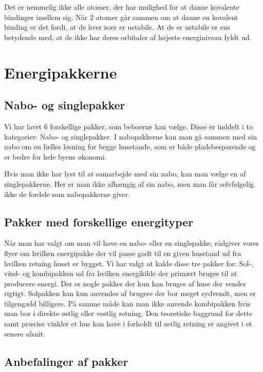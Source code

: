 \documentclass[12pt,a4paper]{article}
\theoremstyle{break}
\theoremstyle{nonumberplain}
\begin{document}
	



\pagebreak



Det er nemmelig ikke alle atomer, der har mulighed for at danne kovalente bindinger imellem sig. Når 2 atomer går sammen om at danne en kovalent binding er det fordi, at de hver især er ustabile. At de er ustabile er ens betydende med, at de ikke har deres orbitaler af højeste energiniveau fyldt ud. 

\section{Energipakkerne}
\subsection{Nabo- og singlepakker}
Vi har lavet 6 forskellige pakker, som beboerne kan vælge. Disse er inddelt i to kategorier: Nabo- og singlepakker.
I nabopakkerne kan man gå sammen med sin nabo om en fælles løsning for begge husstande, som er både pladsbesparende og er bedre for hele byens økonomi. 

Hvis man ikke har lyst til at samarbejde med sin nabo, kan man vælge en af singlepakkerne. 
Her er man ikke afhængig af sin nabo, men man får selvfølgelig ikke de fordele som nabopakkerne giver. 

\subsection{Pakker med forskellige energityper}
Når man har valgt om man vil have en nabo- eller en singlepakke, rådgiver vores flyer om hvilken energipakke der vil passe godt til en given husstand ud fra hvilken retning huset er bygget. 
Vi har valgt at kalde disse tre pakker for: Sol-, vind- og kombipakken ud fra hvilken energikilde der primært bruges til at producere energi. 
Der er nogle pakker der kun kan bruges af huse der vender rigtigt. Solpakken kan kun anvendes af brugere der bor meget sydvendt, men er tilgengæld billigere. 
På samme måde kan man ikke anvende kombipakken hvis man bor i direkte østlig eller vestlig retning. 
Den teoretiske baggrund for dette samt præcise vinkler et hus kan have i forholdt til østlig retning er angivet i et senere afsnit.  

\pagebreak

\subsection{Anbefalinger af pakker}
\end{document}
